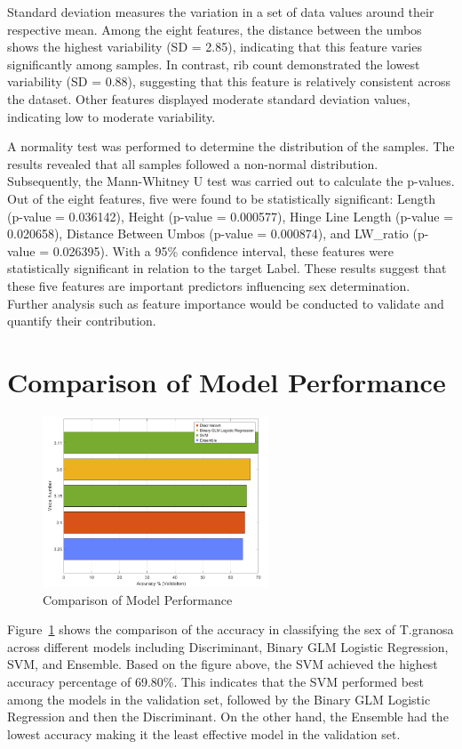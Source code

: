 Standard deviation measures the variation in a set of data values around their respective mean. Among the eight features, the distance between the umbos shows the highest variability (SD = 2.85), indicating that this feature varies significantly among samples. In contrast, rib count demonstrated the lowest variability (SD = 0.88), suggesting that this feature is relatively consistent across the dataset. Other features displayed moderate standard deviation values, indicating low to moderate variability.

A normality test was performed to determine the distribution of the samples. The results revealed that all samples followed a non-normal distribution. Subsequently, the Mann-Whitney U test was carried out to calculate the p-values. Out of the eight features, five were found to be statistically significant: Length (p-value = 0.036142), Height (p-value = 0.000577), Hinge Line Length (p-value = 0.020658), Distance Between Umbos (p-value = 0.000874), and LW\_ratio (p-value = 0.026395). With a 95\% confidence interval, these features were statistically significant in relation to the target Label. These results suggest that these five features are important predictors influencing sex determination. Further analysis such as feature importance would be conducted to validate and quantify their contribution.  


\section{Comparison of Model Performance}
\begin{figure}[!htbp]
	\centering
	\includegraphics[width=0.6\textwidth]{figures/compare-models.png}
	\caption{Comparison of Model Performance}
	\label{fig:compare-models}
\end{figure}

Figure~\ref{fig:compare-models} shows the comparison of the accuracy in classifying the sex of T.granosa across different models including Discriminant, Binary GLM Logistic Regression, SVM, and Ensemble. Based on the figure above, the SVM achieved the highest accuracy percentage of 69.80\%. This indicates that the SVM performed best among the models in the validation set, followed by the Binary GLM Logistic Regression and then the Discriminant. On the other hand, the Ensemble had the lowest accuracy making it the least effective model in the validation set. 

